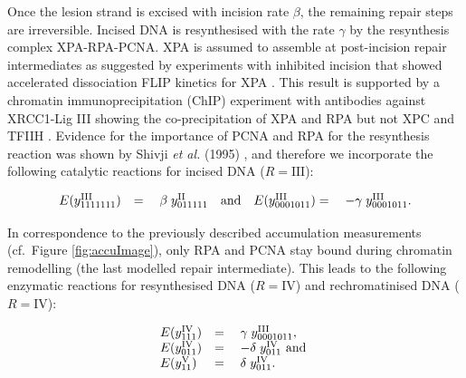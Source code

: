 Once the lesion strand is excised with incision rate $\beta$, the remaining repair steps are irreversible. Incised DNA is resynthesised with the rate $\gamma$ by the resynthesis complex  XPA-RPA-PCNA. XPA is assumed to assemble at post-incision repair intermediates as suggested by experiments with inhibited incision that showed accelerated dissociation FLIP kinetics for XPA  \cite{Luijsterburg2010}. This result is supported by a chromatin immunoprecipitation (ChIP) experiment with antibodies against XRCC1-Lig III showing the co-precipitation of XPA and RPA but not XPC and TFIIH \cite{Moser:2007:Mol-Cell:17643379}. Evidence for the importance of PCNA and RPA for the resynthesis reaction was shown by Shivji \textit{et al.} (1995) \cite{Shivji:1995:Biochemistry:7711023}, and therefore we incorporate the following catalytic reactions for incised DNA ($R= \text{III}$):  
            
\begin{align*}
\begin{array}{l l llll}
E(y_{1111111}^\text{III})&=&\;	\beta \;	y_{011111}^\text{II}	 \quad \text{and}
&E(y_{0001011}^\text{III})=&\;	-\gamma	\;y_{0001011}^\text{III}.	 \\
\end{array}
\end{align*}

In correspondence to the previously described accumulation measurements (cf.\ Figure \ref{fig:accuImage}), only RPA and PCNA stay bound during chromatin remodelling (the last modelled repair intermediate). This leads to the following enzymatic reactions for resynthesised DNA  ($R= \text{IV}$) and rechromatinised DNA ($R= \text{IV}$):


\begin{align*}
\begin{array}{l l llll}
E(y_{111}^\text{IV})&=&\;	\gamma \;	y_{0001011}^\text{III},\\	 
E(y_{011}^\text{IV})&=&\;	-\delta	\;y_{011}^\text{IV} \text{ and }	 \\
 E(y_{11}^\text{V})&=&\;	\delta	\;y_{011}^\text{IV}.
\end{array}
\end{align*}

